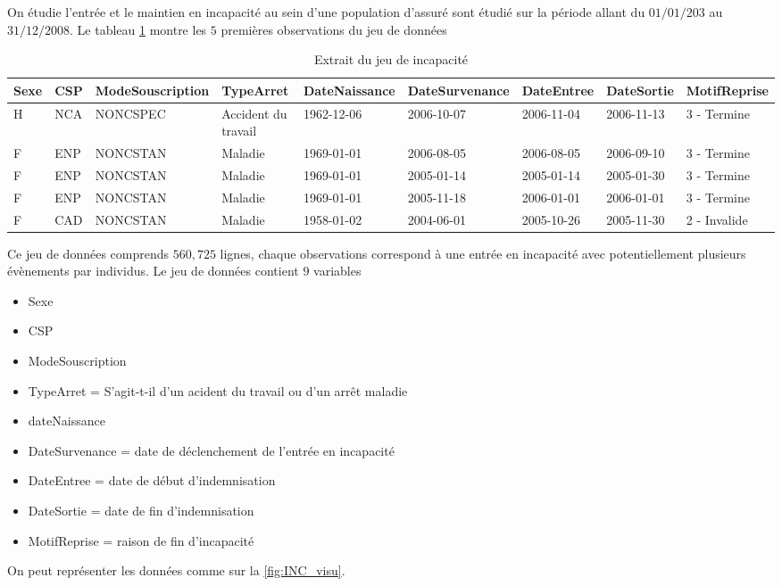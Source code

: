 On étudie l'entrée et le maintien en incapacité au sein d'une population d'assuré sont étudié sur la période allant du $01/01/203$ au $31/12/2008$. Le tableau \cref{tab:incap_data} montre les $5$ premières observations  du jeu de données
\begin{table}[ht]
\centering
\scriptsize
\begin{tabular}{lllllllll}
  \hline
  Sexe & CSP & ModeSouscription & TypeArret & DateNaissance & DateSurvenance & DateEntree & DateSortie & MotifReprise \\ 
  \hline
 H & NCA & NONCSPEC & Accident du travail & 1962-12-06 & 2006-10-07 & 2006-11-04 & 2006-11-13 & 3 - Termine \\ 
  F & ENP & NONCSTAN & Maladie & 1969-01-01 & 2006-08-05 & 2006-08-05 & 2006-09-10 & 3 - Termine \\ 
  F & ENP & NONCSTAN & Maladie & 1969-01-01 & 2005-01-14 & 2005-01-14 & 2005-01-30 & 3 - Termine \\ 
  F & ENP & NONCSTAN & Maladie & 1969-01-01 & 2005-11-18 & 2006-01-01 & 2006-01-01 & 3 - Termine \\ 
  F & CAD & NONCSTAN & Maladie & 1958-01-02 & 2004-06-01 & 2005-10-26 & 2005-11-30 & 2 - Invalide \\ 
   \hline
\end{tabular}
\caption{Extrait du jeu de incapacité}
\label{tab:incap_data}
\end{table}
Ce jeu de données comprends $560,725$ lignes, chaque observations correspond à une entrée en incapacité avec potentiellement plusieurs évènements par individus. Le jeu de données contient $9$ variables 
\begin{itemize}
 \item Sexe
 \item CSP
 \item ModeSouscription
 \item TypeArret =  S'agit-t-il d'un acident du travail ou d'un arrêt maladie
 \item dateNaissance
 \item DateSurvenance = date de déclenchement de l'entrée en incapacité
 \item DateEntree =  date de début d'indemnisation
 \item DateSortie = date de fin d'indemnisation
 \item MotifReprise = raison de fin d'incapacité
\end{itemize}
On peut représenter les données comme sur la \cref{fig:INC_visu}. 
